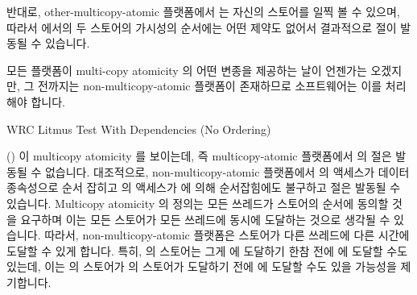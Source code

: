 {	\fi

	반대로, other-multicopy-atomic 플랫폼에서  는 자신의 스토어를
	일찍 볼 수 있으며, 따라서  에서의 두 스토어의 가시성의
	순서에는 어떤 제약도 없어서 결과적으로  절이 발동될 수
	있습니다.

}\QuickQuizEnd

모든 플랫폼이 multi-copy atomicity 의 어떤 변종을 제공하는 날이 언젠가는
오겠지만, 그 전까지는 non-multicopy-atomic 플랫폼이 존재하므로 소프트웨어는
이를 처리해야 합니다.

\begin{listing}[tbp]

\caption{WRC Litmus Test With Dependencies (No Ordering)}
\label{lst:memorder:WRC Litmus Test With Dependencies (No Ordering)}
\end{listing}

\begin{fcvref}
()
이 multicopy atomicity 를 보이는데, 즉 multicopy-atomic 플랫폼에서
 의  절은 발동될 수 없습니다.
대조적으로, non-multicopy-atomic 플랫폼에서  의 액세스가 데이터
종속성으로 순서 잡히고  의 액세스가  에 의해
순서잡힘에도 불구하고  절은 발동될 수 있습니다.
Multicopy atomicity 의 정의는 모든 쓰레드가 스토어의 순서에 동의할 것을
요구하며 이는 모든 스토어가 모든 쓰레드에 동시에 도달하는 것으로 생각될 수
있습니다.
따라서, non-multicopy-atomic 플랫폼은 스토어가 다른 쓰레드에 다른 시간에 도달할
수 있게 합니다.
특히,  의 스토어는 그게  에 도달하기 한참 전에  에
도달할 수도 있는데, 이는  의 스토어가  의 스토어가 도달하기
전에  에 도달할 수도 있을 가능성을 제기합니다.
\end{fcvref}

